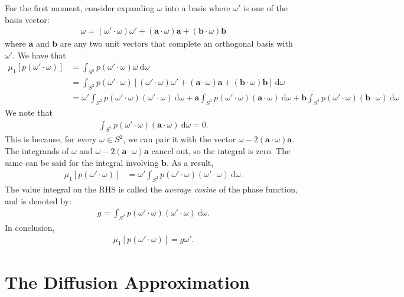 \documentclass[10pt]{article}
\newcommand{\dee}{\mathrm{d}}
\newcommand{\ve}[1]{\mathbf{#1}}
\begin{document}
  For the first moment, consider expanding $\omega$ into a basis where $\omega'$ is one of the basis vector:
  \begin{align*}
  	\omega = (\omega' \cdot \omega)\omega' + (\ve{a} \cdot \omega)\ve{a} + (\ve{b} \cdot \omega)\ve{b}
  \end{align*}
  where $\ve{a}$ and $\ve{b}$ are any two unit vectors that complete an orthogonal basis with $\omega'$.  We have that
  \begin{align*}
  	\mu_1[p(\omega' \cdot \omega)] 
  	&= \int_{S^2} p(\omega' \cdot \omega) \omega\ \dee \omega \\
  	&= \int_{S^2} p(\omega' \cdot \omega) [(\omega' \cdot \omega)\omega' + (\ve{a} \cdot \omega)\ve{a} + (\ve{b} \cdot \omega)\ve{b}] \ \dee \omega \\
  	&= \omega' \int_{S^2} p(\omega' \cdot \omega) (\omega' \cdot \omega)\ \dee \omega
  	+ \ve{a} \int_{S^2} p(\omega' \cdot \omega) (\ve{a} \cdot \omega)\ \dee \omega
  	+ \ve{b} \int_{S^2} p(\omega' \cdot \omega) (\ve{b} \cdot \omega)\ \dee \omega
  \end{align*}
  We note that
  \begin{align*}
  	\int_{S^2} p(\omega' \cdot \omega) (\ve{a} \cdot \omega)\ \dee \omega = 0.
  \end{align*}
  This is because, for every $\omega \in S^2$, we can pair it with the vector $\omega - 2(\ve{a}\cdot\omega) \ve{a}$.  The integrands of $\omega$ and $\omega - 2(\ve{a}\cdot\omega)\ve{a}$ cancel out, so the integral is zero.  The same can be said for the integral involving $\ve{b}$.  As a result,
  \begin{align*}
  	\mu_1[p(\omega' \cdot \omega)] 
  	&= \omega' \int_{S^2} p(\omega' \cdot \omega) (\omega' \cdot \omega)\ \dee \omega.
  \end{align*}
  The value integral on the RHS is called the \emph{average cosine} of the phase function, and is denoted by:
  \begin{align*}
  	g = \int_{S^2} p(\omega' \cdot \omega) (\omega' \cdot \omega)\ \dee \omega.
  \end{align*}
  In conclusion,
  \begin{align}
  	\mu_1[p(\omega' \cdot \omega)]  = g\omega'.
  \end{align}

  \section{The Diffusion Approximation}
\end{document}
